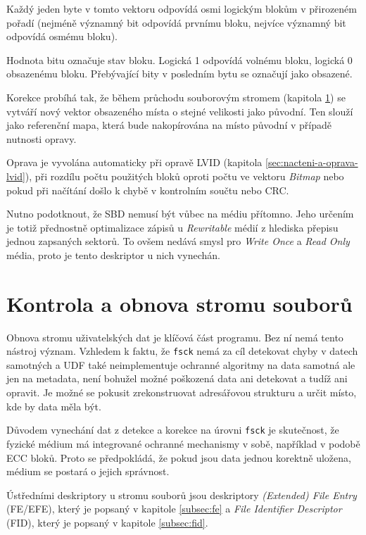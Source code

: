 Každý jeden byte v tomto vektoru odpovídá osmi logickým blokům v přirozeném pořadí (nejméně významný bit odpovídá prvnímu bloku, nejvíce významný bit odpovídá osmému bloku).

Hodnota bitu označuje stav bloku. Logická 1 odpovídá volnému bloku, logická 0 obsazenému bloku. Přebývající bity v posledním bytu se označují jako obsazené.

Korekce probíhá tak, že během průchodu souborovým stromem (kapitola \ref{sec:filetree}) se vytváří nový vektor obsazeného místa o stejné velikosti jako původní. Ten slouží jako referenční mapa, která bude nakopírována na místo původní v případě nutnosti opravy.

Oprava je vyvolána automaticky při opravě LVID (kapitola \ref{sec:nacteni-a-oprava-lvid}), při rozdílu počtu použitých bloků oproti počtu ve vektoru \textit{Bitmap} nebo pokud při načítání došlo k chybě v kontrolním součtu nebo CRC.

Nutno podotknout, že SBD nemusí být vůbec na médiu přítomno. Jeho určením je totiž přednostně optimalizace zápisů u \textit{Rewritable} médií z hlediska přepisu jednou zapsaných sektorů. To ovšem nedává smysl pro \textit{Write Once} a \textit{Read Only} média, proto je tento deskriptor u nich vynechán.

\section{Kontrola a obnova stromu souborů}
\label{sec:filetree}
Obnova stromu uživatelských dat je klíčová část programu. Bez ní nemá tento nástroj význam. Vzhledem k faktu, že \texttt{fsck} nemá za cíl detekovat chyby v datech samotných a UDF také neimplementuje ochranné algoritmy na data samotná ale jen na metadata, není bohužel možné poškozená data ani detekovat a tudíž ani opravit. Je možné se pokusit zrekonstruovat adresářovou strukturu a určit místo, kde by data měla být.

Důvodem vynechání dat z detekce a korekce na úrovni \texttt{fsck} je skutečnost, že fyzické médium má integrované ochranné mechanismy v sobě, například v podobě ECC bloků. Proto se předpokládá, že pokud jsou data jednou korektně uložena, médium se postará o jejich správnost.

Ústředními deskriptory u stromu souborů jsou deskriptory \textit{(Extended) File Entry} (FE/EFE), který je popsaný v kapitole \ref{subsec:fe} a \textit{File Identifier Descriptor} (FID), který je popsaný v kapitole \ref{subsec:fid}.
 
